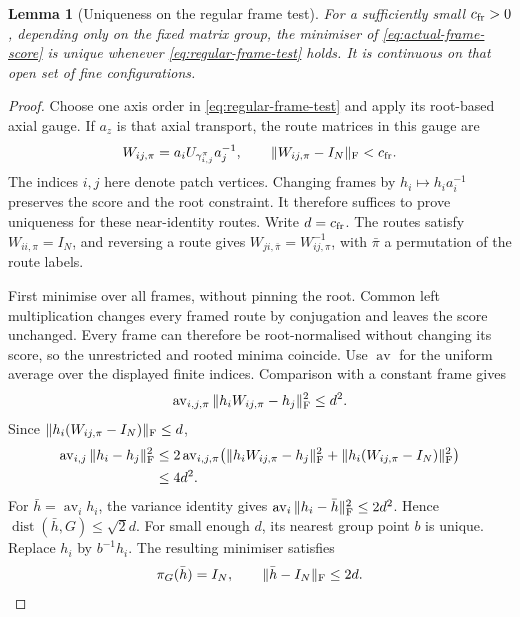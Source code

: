 \documentclass[11pt,reqno]{amsart}
\numberwithin{equation}{section}
\newtheorem{lemma}[theorem]{Lemma}
\theoremstyle{definition}
\theoremstyle{remark}
\begin{document}
\begin{lemma}[Uniqueness on the regular frame test]
\label{lem:regular-frame-unique}
For a sufficiently small \(c_{\rm fr}>0\), depending only on
the fixed matrix group, the minimiser of
\eqref{eq:actual-frame-score} is unique whenever
\eqref{eq:regular-frame-test} holds. It is continuous on that
open set of fine configurations.
\end{lemma}
\begin{proof}
Choose one axis order in \eqref{eq:regular-frame-test} and apply
its root-based axial gauge. If \(a_z\) is that axial transport,
the route matrices in this gauge are
\[
       W_{ij,\pi}=a_iU_{\gamma^\pi_{i,j}}a_j^{-1},
       \qquad \|W_{ij,\pi}-I_N\|_{\rm F}<c_{\rm fr}.
\]
The indices \(i,j\) here denote patch vertices. Changing frames
by \(h_i\mapsto h_i a_i^{-1}\) preserves the score and the
root constraint. It therefore suffices to prove uniqueness
for these near-identity routes. Write \(d=c_{\rm fr}\).
The routes satisfy \(W_{ii,\pi}=I_N\), and reversing a route
gives \(W_{ji,\bar\pi}=W_{ij,\pi}^{-1}\), with \(\bar\pi\)
a permutation of the route labels.

First minimise over all frames, without pinning the root.
Common left multiplication changes every framed route by
conjugation and leaves the score unchanged. Every frame can
therefore be root-normalised without changing its score, so
the unrestricted and rooted minima coincide. Use
\(\operatorname{av}\) for the uniform average over the displayed
finite indices. Comparison with a constant frame gives
\[
 \operatorname{av}_{i,j,\pi}\|h_iW_{ij,\pi}-h_j\|_{\rm F}^2
                                                     \le d^2.
\]
Since \(\|h_i(W_{ij,\pi}-I_N)\|_{\rm F}\le d\),
\begin{align*}
 \operatorname{av}_{i,j}\|h_i-h_j\|_{\rm F}^2
 &\le2\operatorname{av}_{i,j,\pi}
       \bigl(\|h_iW_{ij,\pi}-h_j\|_{\rm F}^2
                      +\|h_i(W_{ij,\pi}-I_N)\|_{\rm F}^2\bigr)\\
 &\le4d^2.
\end{align*}
For \(\bar h=\operatorname{av}_i h_i\), the variance identity
gives \(\operatorname{av}_i\|h_i-\bar h\|_{\rm F}^2\le2d^2\).
Hence \(\operatorname{dist}(\bar h,G)\le\sqrt2d\).
For small enough \(d\), its nearest group point \(b\) is unique.
Replace \(h_i\) by \(b^{-1}h_i\). The resulting minimiser satisfies
\begin{equation}
       \pi_G(\bar h)=I_N,\qquad \|\bar h-I_N\|_{\rm F}\le2d.
 \label{eq:centred-frame-mean}
\end{equation}


\end{proof}
\end{document}
